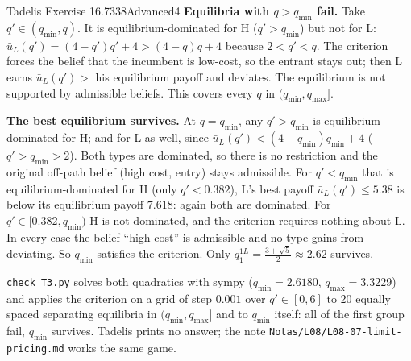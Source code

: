 \begin{exsol}{Tadelis Exercise 16.7}{338}{Advanced}{4}
\textbf{Equilibria with $q > q_{\min}$ fail.} Take $q' \in (q_{\min}, q)$. It is equilibrium-dominated for
H ($q' > q_{\min}$) but not for L: $\bar u_L(q') = (4 - q')q' + 4 > (4 - q)q + 4$ because $2 < q' < q$.
The criterion forces the belief that the incumbent is low-cost, so the entrant stays out; then L earns
$\bar u_L(q') > $ his equilibrium payoff and deviates. The equilibrium is not supported by admissible
beliefs. This covers every $q$ in $(q_{\min}, q_{\max}]$.

\textbf{The best equilibrium survives.} At $q = q_{\min}$, any $q' > q_{\min}$ is equilibrium-dominated for H;
and for L as well, since $\bar u_L(q') < (4 - q_{\min})q_{\min} + 4$ ($q' > q_{\min} > 2$). Both types
are dominated, so there is no restriction and the original off-path belief (high cost, entry)
stays admissible. For $q' < q_{\min}$ that is equilibrium-dominated for H (only $q' < 0.382$), L's best payoff
$\bar u_L(q') \le 5.38$ is below its equilibrium payoff $7.618$: again both are dominated. For
$q' \in [0.382, q_{\min})$ H is not dominated, and the criterion requires nothing about L. In every case the
belief ``high cost'' is admissible and no type gains from deviating. So $q_{\min}$ satisfies the criterion.
Only $q_1^{1L} = \frac{3 + \sqrt5}{2} \approx 2.62$ survives.

\verify \texttt{check\_T3.py} solves both quadratics with sympy ($q_{\min} = 2.6180$, $q_{\max} = 3.3229$)
and applies the criterion on a grid of step $0.001$ over $q' \in [0, 6]$ to 20 equally spaced separating
equilibria in $(q_{\min}, q_{\max}]$ and to $q_{\min}$ itself: all of the first group fail, $q_{\min}$ survives.
Tadelis prints no answer; the note \texttt{Notas/L08/L08-07-limit-pricing.md} works the same game.

\end{exsol}
